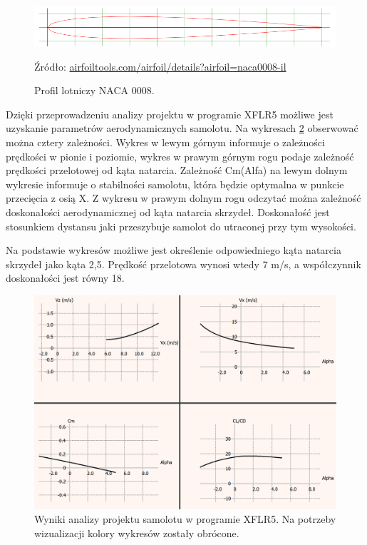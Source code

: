 \documentclass[12pt, a4paper]{article}
\begin{document}
 \begin{figure}[ht]
    \centering
    \includegraphics[width=1\textwidth]{naca0008}
    \caption{Profil lotniczy NACA 0008.}
    \small Źródło: \url{airfoiltools.com/airfoil/details?airfoil=naca0008-il}
    \label{fig:naca}
\end{figure}

Dzięki przeprowadzeniu analizy projektu w programie XFLR5 możliwe jest uzyskanie parametrów aerodynamicznych samolotu. Na wykresach \ref{fig:wykresy} obserwować można cztery zależności. Wykres w lewym górnym informuje o zależności prędkości w pionie i poziomie, wykres w prawym górnym rogu podaje zależność prędkości przelotowej od kąta natarcia. Zależność Cm(Alfa) na lewym dolnym wykresie informuje o stabilności samolotu, która będzie optymalna w punkcie przecięcia z osią X. Z wykresu w prawym dolnym rogu odczytać można zależność doskonałości aerodynamicznej od kąta natarcia skrzydeł. Doskonałość jest stosunkiem dystansu jaki przeszybuje samolot do utraconej przy tym wysokości.

Na podstawie wykresów możliwe jest określenie odpowiedniego kąta natarcia skrzydeł jako kąta 2,5\textdegree. Prędkość przelotowa wynosi wtedy 7 m/s, a współczynnik doskonałości jest równy 18.

\begin{figure}[ht]
    \centering
    \includegraphics[width=1\textwidth]{wykresy}
    \caption{Wyniki analizy projektu samolotu w programie XFLR5. Na potrzeby wizualizacji kolory wykresów zostały obrócone.}
    \label{fig:wykresy}
\end{figure}
\end{document}
